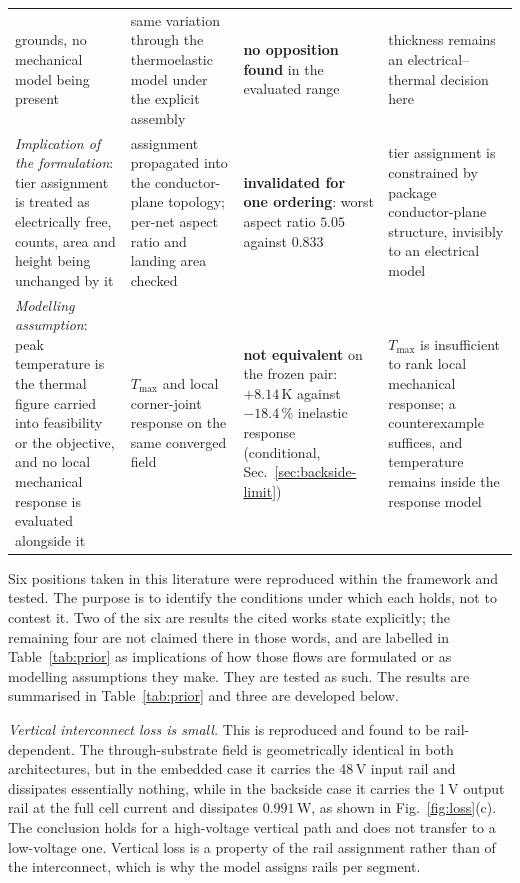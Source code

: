\documentclass[journal]{IEEEtran}
\begin{document}
\begin{table}[!t]
\begin{tabular}{@{}p{4.5cm}p{3.9cm}p{3.7cm}p{4.5cm}@{}}
grounds, no mechanical model being present \cite{Krishnakumar2026DVPD,Sriharini_ECTC_24}
& same variation through the thermoelastic model under the explicit assembly
& \textbf{no opposition found} in the evaluated range
& thickness remains an electrical--thermal decision here \\
\emph{Implication of the formulation}: tier assignment is treated as electrically free, counts,
area and height being unchanged by it \cite{Krishnakumar2026DVPD,VPD2023Architectures}
& assignment propagated into the conductor-plane topology; per-net aspect ratio and landing area checked
& \textbf{invalidated for one ordering}: worst aspect ratio $5.05$ against $0.833$
& tier assignment is constrained by package conductor-plane structure, invisibly to an electrical model \\
\emph{Modelling assumption}: peak temperature is the thermal figure carried into feasibility or
the objective, and no local mechanical response is evaluated alongside it
\cite{Krishnakumar2026DVPD,ISCAS2024DVPD,Wang2025TTSV}
& $T_{\max}$ and local corner-joint response on the same converged field
& \textbf{not equivalent} on the frozen pair: $+8.14$\,K against $-18.4$\,\% inelastic response (conditional, Sec.~\ref{sec:backside-limit})
& $T_{\max}$ is insufficient to rank local mechanical response; a counterexample suffices, and temperature remains inside the response model \\
\bottomrule
\end{tabular}
\end{table}

Six positions taken in this literature were reproduced within the framework and tested. The
purpose is to identify the conditions under which each holds, not to contest it. Two of the
six are results the cited works state explicitly; the remaining four are not claimed there in
those words, and are labelled in Table~\ref{tab:prior} as implications of how those flows are
formulated or as modelling assumptions they make. They are tested as such. The results are
summarised in Table~\ref{tab:prior} and three are developed below.

\emph{Vertical interconnect loss is small.} This is reproduced and found to be
rail-dependent. The through-substrate field is geometrically identical in both
architectures, but in the embedded case it carries the 48\,V input rail and dissipates
essentially nothing, while in the backside case it carries the 1\,V output rail at the full
cell current and dissipates $0.991$\,W, as shown in Fig.~\ref{fig:loss}(c). The conclusion
holds for a high-voltage vertical path and does not transfer to a low-voltage one. Vertical
loss is a property of the rail assignment rather than of the interconnect, which is why the
model assigns rails per segment.
\end{document}
